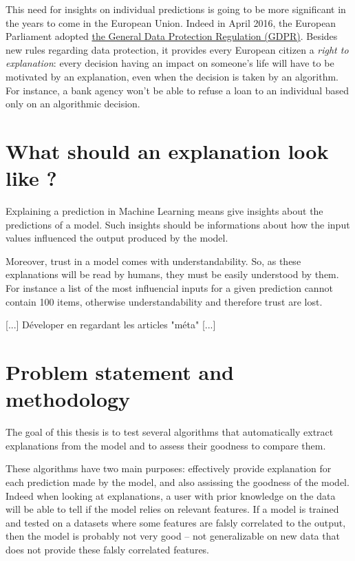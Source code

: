 \documentclass[a4paper,11pt]{kth-mag}
\begin{document}
This need for insights on individual predictions is going to be more significant in the years to come in the European Union. Indeed in April 2016, the European Parliament adopted \href{http://eur-lex.europa.eu/eli/reg/2016/679/oj}{the General Data Protection Regulation (GDPR)}. Besides new rules regarding data protection, it provides every European citizen a \textit{right to explanation}: every decision having an impact on someone's life will have to be motivated by an explanation, even when the decision is taken by an algorithm. For instance, a bank agency won't be able to refuse a loan to an individual based only on an algorithmic decision.

\section{What should an explanation look like ?}

Explaining a prediction in Machine Learning means give insights about the predictions of a model. Such insights should be informations about how the input values influenced the output produced by the model. 

Moreover, trust in a model comes with understandability. So, as these explanations will be read by humans, they must be easily understood by them. For instance a list of the most influencial inputs for a given prediction cannot contain 100 items, otherwise understandability and therefore trust are lost.


[...] Déveloper en regardant les articles "méta" [...]

\section{Problem statement and methodology}

The goal of this thesis is to test several algorithms that automatically extract explanations from the model and to assess their goodness to compare them.

These algorithms have two main purposes: effectively provide explanation for each prediction made by the model, and also assissing the goodness of the model. Indeed when looking at explanations, a user with prior knowledge on the data will be able to tell if the model relies on relevant features. If a model is trained and tested on a datasets where some features are falsly correlated to the output, then the model is probably not very good -- not generalizable on new data that does not provide these falsly correlated features.
\end{document}
